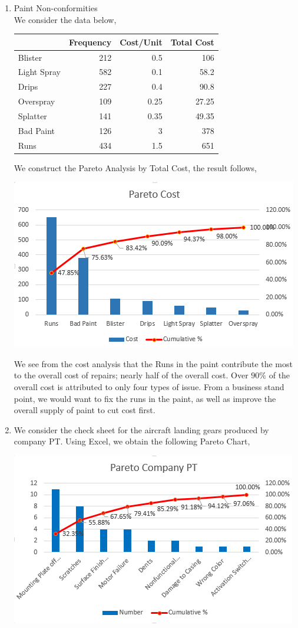 \documentclass[letterpaper,10pt]{article}
\begin{document}
\begin{enumerate}
\item Paint Non-conformities\\
We consider the data below,
\begin{center}
\begin{tabular}{|l|r|r|r|}
\hline
 & Frequency & Cost/Unit & Total Cost\\\hline
Blister & 212 & 0.5 & 106 \\\hline
Light Spray & 582 & 0.1 & 58.2 \\\hline
Drips & 227 & 0.4 & 90.8 \\\hline
Overspray & 109 & 0.25 & 27.25\\\hline
Splatter & 141 & 0.35 & 49.35\\\hline
Bad Paint & 126 & 3 & 378\\\hline
Runs & 434 & 1.5 & 651\\\hline
\end{tabular}
\end{center}
We construct the Pareto Analysis by Total Cost, the result follows,
\begin{center}
\includegraphics[scale=1]{1costpareto.png}
\end{center}
We see from the cost analysis that the Runs in the paint contribute the most to the overall cost of repairs; nearly half of the overall cost. Over $90\%$ of the overall cost is attributed to only four types of issue. From a business stand point, we would want to fix the runs in the paint, as well as improve the overall supply of paint to cut cost first.
\item We consider the check sheet for the aircraft landing gears produced by company PT. Using Excel, we obtain the following Pareto Chart,
\begin{center}
\includegraphics[scale=1]{2checkpareto.png}

\end{center}
\end{enumerate}
\end{document}

